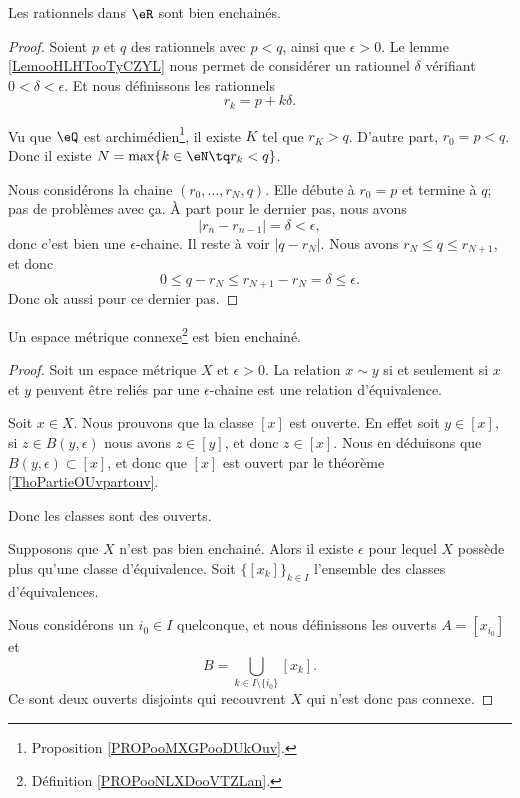 \begin{lemma}
	Les rationnels dans \( \eR\) sont bien enchainés.
\end{lemma}

\begin{proof}
	Soient \( p\) et \( q\) des rationnels avec \( p<q\), ainsi que \( \epsilon>0\). Le lemme \ref{LemooHLHTooTyCZYL} nous permet de considérer un rationnel \( \delta\) vérifiant \( 0<\delta<\epsilon\). Et nous définissons les rationnels
	\begin{equation}
		r_k=p+k\delta.
	\end{equation}

	Vu que \( \eQ\) est archimédien\footnote{Proposition \ref{PROPooMXGPooDUkOuv}.}, il existe \( K\) tel que \( r_{K}>q\). D'autre part, \( r_0=p<q\). Donc il existe \( N=\max\{ k\in \eN\tq r_k<q \}\).

	Nous considérons la chaine \( (r_0,\ldots, r_N, q)\). Elle débute à \( r_0=p\) et termine à \( q\); pas de problèmes avec ça. À part pour le dernier pas, nous avons
	\begin{equation}
		| r_n-r_{n-1} |=\delta<\epsilon,
	\end{equation}
	donc c'est bien une \( \epsilon\)-chaine. Il reste à voir \( | q-r_N |\). Nous avons \( r_N\leq q\leq r_{N+1}\), et donc
	\begin{equation}
		0\leq q-r_N\leq r_{N+1}-r_N=\delta\leq \epsilon.
	\end{equation}
	Donc ok aussi pour ce dernier pas.
\end{proof}

\begin{proposition}       \label{PROPooBUNOooIvfugn}
	Un espace métrique connexe\footnote{Définition \ref{PROPooNLXDooVTZLan}.} est bien enchainé.
\end{proposition}

\begin{proof}
	Soit un espace métrique \( X\) et \( \epsilon>0\). La relation \( x\sim y\) si et seulement si \( x\) et \( y\) peuvent être reliés par une \( \epsilon\)-chaine est une relation d'équivalence.

	Soit \( x\in X\). Nous prouvons que la classe \( [x]\) est ouverte. En effet soit \( y\in [x]\), si \( z\in B(y,\epsilon)\) nous avons \( z\in [y]\), et donc \( z\in [x]\). Nous en déduisons que \( B(y,\epsilon)\subset [x]\), et donc que \( [x]\) est ouvert par le théorème \ref{ThoPartieOUvpartouv}.

	Donc les classes sont des ouverts.

	Supposons que \( X\) n'est pas bien enchainé. Alors il existe \( \epsilon\) pour lequel \( X\) possède plus qu'une classe d'équivalence. Soit \( \{ [x_k] \}_{k\in I}\) l'ensemble des classes d'équivalences.

	Nous considérons un \( i_0\in I\) quelconque, et nous définissons les ouverts \( A=[x_{i_0}]\) et
	\begin{equation}
		B=\bigcup_{k\in I\setminus\{ i_0 \}}[x_k].
	\end{equation}
	Ce sont deux ouverts disjoints qui recouvrent \( X\) qui n'est donc pas connexe.
\end{proof}

